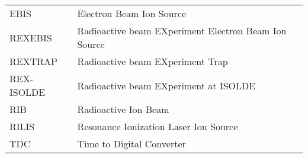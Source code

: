 \begin{tabular}{ll}
    EBIS        &  Electron Beam Ion Source                                   \\
    REXEBIS     &  Radioactive beam EXperiment Electron Beam Ion Source       \\
    REXTRAP     &  Radioactive beam EXperiment Trap                           \\
    REX-ISOLDE  &  Radioactive beam EXperiment at ISOLDE                      \\
    RIB         &  Radioactive Ion Beam                                       \\
    RILIS       &  Resonance Ionization Laser Ion Source                      \\
    TDC         &  Time to Digital Converter                                  \\
    \hline
\end{tabular}
\label{tab:acro}
